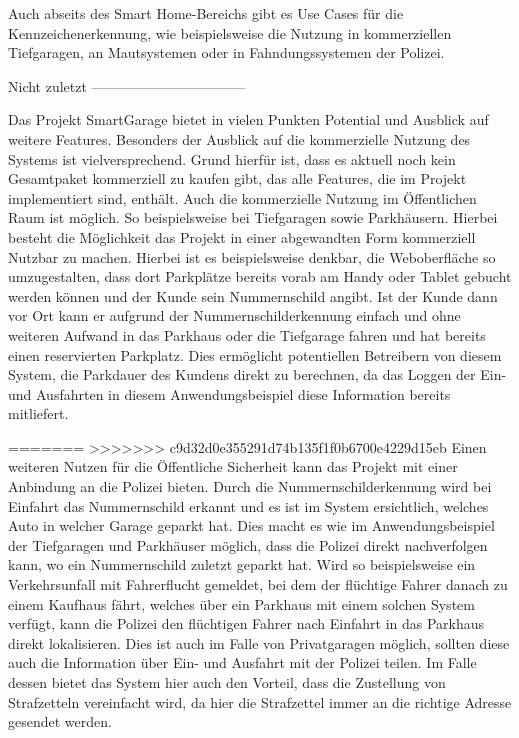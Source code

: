 Auch abseits des Smart Home-Bereichs gibt es Use Cases für die Kennzeichenerkennung, wie beispielsweise die Nutzung in kommerziellen Tiefgaragen, an Mautsystemen oder in Fahndungssystemen der Polizei.

Nicht zuletzt 
---------------------------------

Das Projekt SmartGarage bietet in vielen Punkten Potential und Ausblick auf weitere Features. Besonders der Ausblick auf die kommerzielle Nutzung des Systems ist vielversprechend. Grund hierfür ist, dass es aktuell noch kein Gesamtpaket kommerziell zu kaufen gibt, das alle Features, die im Projekt implementiert sind, enthält. Auch die kommerzielle Nutzung im Öffentlichen Raum ist möglich. So beispielsweise bei Tiefgaragen sowie Parkhäusern. Hierbei besteht die Möglichkeit das Projekt in einer abgewandten Form kommerziell Nutzbar zu machen. Hierbei ist es beispielsweise denkbar, die Weboberfläche so umzugestalten, dass dort Parkplätze bereits vorab am Handy oder Tablet gebucht werden können und der Kunde sein Nummernschild angibt. Ist der Kunde dann vor Ort kann er aufgrund der Nummernschilderkennung einfach und ohne weiteren Aufwand in das Parkhaus oder die Tiefgarage fahren und hat bereits einen reservierten Parkplatz. Dies ermöglicht potentiellen Betreibern von diesem System, die Parkdauer des Kundens direkt zu berechnen, da das Loggen der Ein- und Ausfahrten in diesem Anwendungsbeispiel diese Information bereits mitliefert. 

=======
>>>>>>> c9d32d0e355291d74b135f1f0b6700e4229d15eb
Einen weiteren Nutzen für die Öffentliche Sicherheit kann das Projekt mit einer Anbindung an die Polizei bieten. Durch die Nummernschilderkennung wird bei Einfahrt das Nummernschild erkannt und es ist im System ersichtlich, welches Auto in welcher Garage geparkt hat. Dies macht es wie im Anwendungsbeispiel der Tiefgaragen und Parkhäuser möglich, dass die Polizei direkt nachverfolgen kann, wo ein Nummernschild zuletzt geparkt hat. Wird so beispielsweise ein Verkehrsunfall mit Fahrerflucht gemeldet, bei dem der flüchtige Fahrer danach zu einem Kaufhaus fährt, welches über ein Parkhaus mit einem solchen System verfügt, kann die Polizei den flüchtigen Fahrer nach Einfahrt in das Parkhaus direkt lokalisieren. Dies ist auch im Falle von Privatgaragen möglich, sollten diese auch die Information über Ein- und Ausfahrt mit der Polizei teilen. Im Falle dessen bietet das System hier auch den Vorteil, dass die Zustellung von Strafzetteln vereinfacht wird, da hier die Strafzettel immer an die richtige Adresse gesendet werden.

